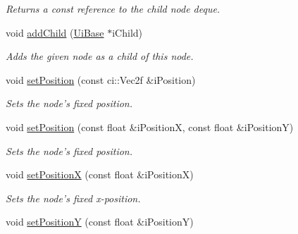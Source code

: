 \begin{DoxyCompactItemize}
\begin{DoxyCompactList}\small\item\em Returns a const reference to the child node deque. \end{DoxyCompactList}\item 
\hypertarget{class_ui_base_a5afb36ad174cccfa9550827e438d65f3}{void \hyperlink{class_ui_base_a5afb36ad174cccfa9550827e438d65f3}{add\-Child} (\hyperlink{class_ui_base}{Ui\-Base} $\ast$i\-Child)}\label{class_ui_base_a5afb36ad174cccfa9550827e438d65f3}

\begin{DoxyCompactList}\small\item\em Adds the given node as a child of this node. \end{DoxyCompactList}\item 
\hypertarget{class_ui_base_a3794d9b40ff778c34f855c708c0c8e79}{void \hyperlink{class_ui_base_a3794d9b40ff778c34f855c708c0c8e79}{set\-Position} (const ci\-::\-Vec2f \&i\-Position)}\label{class_ui_base_a3794d9b40ff778c34f855c708c0c8e79}

\begin{DoxyCompactList}\small\item\em Sets the node's fixed position. \end{DoxyCompactList}\item 
\hypertarget{class_ui_base_ad4b04187ce4df44e9b124628a0acc65f}{void \hyperlink{class_ui_base_ad4b04187ce4df44e9b124628a0acc65f}{set\-Position} (const float \&i\-Position\-X, const float \&i\-Position\-Y)}\label{class_ui_base_ad4b04187ce4df44e9b124628a0acc65f}

\begin{DoxyCompactList}\small\item\em Sets the node's fixed position. \end{DoxyCompactList}\item 
\hypertarget{class_ui_base_a76c6d59b105c3d4a0e785545ca2471d4}{void \hyperlink{class_ui_base_a76c6d59b105c3d4a0e785545ca2471d4}{set\-Position\-X} (const float \&i\-Position\-X)}\label{class_ui_base_a76c6d59b105c3d4a0e785545ca2471d4}

\begin{DoxyCompactList}\small\item\em Sets the node's fixed x-\/position. \end{DoxyCompactList}\item 
\hypertarget{class_ui_base_a56f534917bcaaf8c55544d883a801f38}{void \hyperlink{class_ui_base_a56f534917bcaaf8c55544d883a801f38}{set\-Position\-Y} (const float \&i\-Position\-Y)}\label{class_ui_base_a56f534917bcaaf8c55544d883a801f38}


\end{DoxyCompactItemize}

